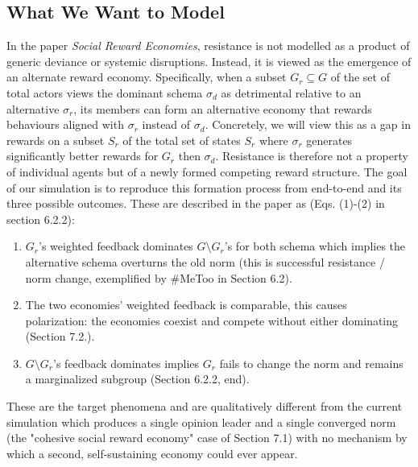 \documentclass[12pt]{article}
\begin{document}
\subsection{What We Want to Model}
In the paper \textit{Social Reward Economies}, resistance is not modelled as a product
of generic deviance or systemic disruptions. Instead, it is viewed as the emergence of an alternate reward economy.
Specifically, when a subset $G_r \subseteq G$ of the set of total actors views the dominant schema $\sigma_d$ as detrimental relative to an alternative $\sigma_r$,
its members can form an alternative economy that rewards behaviours aligned with $\sigma_r$ instead of $\sigma_d$.
Concretely, we will view this as a gap in rewards on a subset $S_r$ of the total set of states $S_r$ where $\sigma_r$ generates significantly better rewards
for $G_r$ then $\sigma_d$. Resistance
is therefore not a property of individual agents but of a newly formed competing reward structure.
The goal of our simulation is to reproduce this formation process from end-to-end and its three possible outcomes.
These are described in the paper as (Eqs. (1)-(2) in section 6.2.2):
\begin{enumerate}
    \item[1.] $G_r$'s weighted feedback dominates $G \setminus G_r$'s for both schema which implies the alternative schema overturns
    the old norm (this is successful resistance / norm change, exemplified by \#MeToo in Section 6.2).
    \item[2.] The two economies' weighted feedback is comparable, this causes polarization: the economies coexist and
    compete without either dominating (Section 7.2.).
    \item[3.] $G \setminus G_r$'s feedback dominates implies $G_r$ fails to change the norm and remains a marginalized subgroup
    (Section 6.2.2, end).
\end{enumerate}
These are the target phenomena and are qualitatively different from the current simulation
which produces a single opinion leader and a single converged norm (the "cohesive social reward economy"
case of Section 7.1) with no mechanism by which a second, self-sustaining economy could ever appear. 
\end{document}
